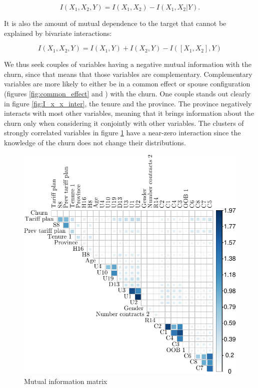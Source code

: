 \begin{equation*}
    I(X_1, X_2, Y) = I(X_1, X_2) - I(X_1, X_2 | Y).
\end{equation*}

It is also the amount of mutual dependence to the target that cannot be explained
by bivariate interactions:

\begin{equation*}
    I(X_1, X_2, Y) = I(X_1, Y) + I(X_2, Y) - I([X_1, X_2], Y)
\end{equation*}

We thus seek couples of variables having a negative mutual information with the
churn, since that means that those variables are complementary. Complementary
variables are more likely to either be in a common effect or spouse
configuration (figures \ref{fig:common_effect} and ) with the
churn. One couple stands out clearly in figure \ref{fig:I_x_x_inter}, the tenure
and the province. The province negatively interacts with most other variables,
meaning that it brings information about the churn only when considering it
conjointly with other variables. The clusters of strongly correlated variables
in figure \ref{fig:I_x_x} have a near-zero interaction since the knowledge of
the churn does not change their distributions.

\begin{figure}
    \centering
    \includegraphics[width=0.8\linewidth]{figures/I_x_x.pdf}
    \caption{Mutual information matrix}
    \label{fig:I_x_x}
\end{figure}

